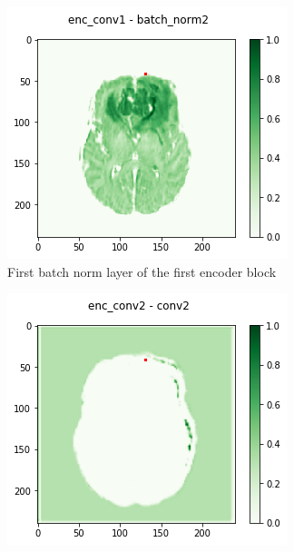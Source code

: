 \begin{figure}[H]
    \centering
    \begin{subfigure}{.33\textwidth}
        \centering
        \includegraphics[width=\linewidth]{chapters/04_segmentation/images/grad_cam_03.png}
        \caption{First batch norm layer of the first encoder block}
    \end{subfigure}%
    \begin{subfigure}{.33\textwidth}
        \centering
        \includegraphics[width=\linewidth]{chapters/04_segmentation/images/grad_cam_05.png}

\end{subfigure}
\end{figure}

